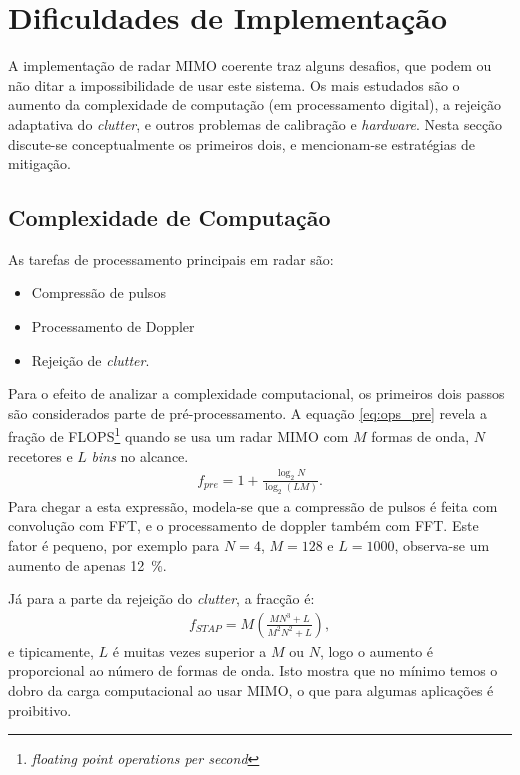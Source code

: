 \documentclass[purist,portuguese]{ist-report}
\begin{document}
\section{Dificuldades de Implementação}

A implementação de radar MIMO coerente traz alguns desafios, que podem ou não ditar a impossibilidade de usar este sistema. 
Os mais estudados são o aumento da complexidade de computação (em processamento digital), a rejeição adaptativa do \textit{clutter}, e outros problemas de calibração e \textit{hardware}.
Nesta secção discute-se conceptualmente os primeiros dois, e mencionam-se estratégias de mitigação.

\subsection{Complexidade de Computação}

As tarefas de processamento principais em radar são:
\begin{itemize}
  \item Compressão de pulsos
  \item Processamento de Doppler
  \item Rejeição de \textit{clutter}.
\end{itemize}

Para o efeito de analizar a complexidade computacional, os primeiros dois passos são considerados parte de pré-processamento.
A equação \ref{eq:ops_pre} revela a fração de FLOPS\footnote{\textit{floating point operations per second}} quando se usa um radar MIMO com $M$ formas de onda, $N$ recetores e $L$ \textit{bins} no alcance.
\begin{align}
  f_{pre}=1+\frac{\log_2 N}{\log_2 (LM)}.
  \label{eq:ops_pre}
\end{align}
Para chegar a esta expressão, modela-se que a compressão de pulsos é feita com convolução com FFT, e o processamento de doppler também com FFT.
Este fator é pequeno, por exemplo para $N=4$, $M=128$ e $L=1000$, observa-se um aumento de apenas \SI{12}{\percent}. 

Já para a parte da rejeição do \textit{clutter}, a fracção é:
\begin{align}
  f_{STAP} = M\left( \frac{MN^3+L}{M^2N^2+L} \right),
  \label{eq:ops_cl}
\end{align}
e tipicamente, $L$ é muitas vezes superior a $M$ ou $N$, logo o aumento é proporcional ao número de formas de onda.
Isto mostra que no mínimo temos o dobro da carga computacional ao usar MIMO, o que para algumas aplicações é proibitivo. 
\end{document}
